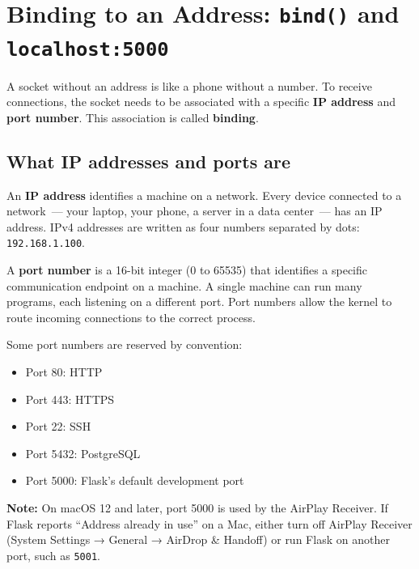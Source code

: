 \setcounter{section}{2}
\section{\texorpdfstring{Binding to an Address: \texttt{bind()} and \texttt{localhost:5000}}{Binding to an Address: bind() and localhost:5000}}\label{03-network-capability:33-binding-to-an-address-bind-and-localhost5000}

A socket without an address is like a phone without a number. To receive connections, the socket needs to be associated with a specific \textbf{IP address} and \textbf{port number}. This association is called \textbf{binding}.

\subsection*{What IP addresses and ports are}\label{03-network-capability:what-ip-addresses-and-ports-are}

An \textbf{IP address} identifies a machine on a network. Every device connected to a network~--- your laptop, your phone, a server in a data center~--- has an IP address. IPv4 addresses are written as four numbers separated by dots: \texttt{192.168.1.100}.

A \textbf{port number} is a 16-bit integer (0 to 65535) that identifies a specific communication endpoint on a machine. A single machine can run many programs, each listening on a different port. Port numbers allow the kernel to route incoming connections to the correct process.

Some port numbers are reserved by convention:

\begin{itemize}
\tightlist
\item
  Port 80: HTTP
\item
  Port 443: HTTPS
\item
  Port 22: SSH
\item
  Port 5432: PostgreSQL
\item
  Port 5000: Flask's default development port
\end{itemize}

\begin{notebox}

\textbf{Note:} On macOS 12 and later, port 5000 is used by the AirPlay Receiver. If Flask reports ``Address already in use'' on a Mac, either turn off AirPlay Receiver (System Settings → General → AirDrop \& Handoff) or run Flask on another port, such as \texttt{5001}.

\end{notebox}

